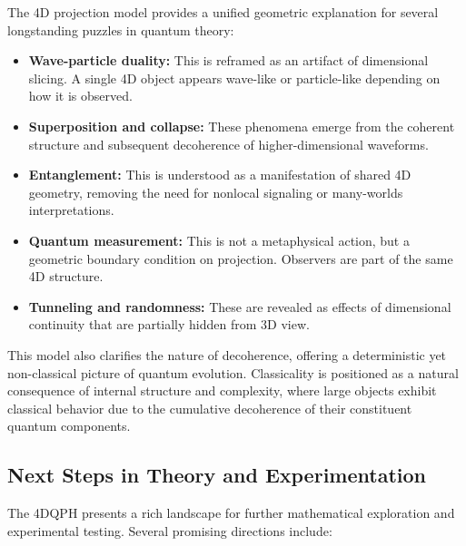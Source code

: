 \documentclass[12pt]{article}
\begin{document}
The 4D projection model provides a unified geometric explanation for several longstanding puzzles in quantum theory:

\begin{itemize}
    \item \textbf{Wave-particle duality:} This is reframed as an artifact of dimensional slicing. A single 4D object appears wave-like or particle-like depending on how it is observed.
    \item \textbf{Superposition and collapse:} These phenomena emerge from the coherent structure and subsequent decoherence of higher-dimensional waveforms.
    \item \textbf{Entanglement:} This is understood as a manifestation of shared 4D geometry, removing the need for nonlocal signaling or many-worlds interpretations.
    \item \textbf{Quantum measurement:} This is not a metaphysical action, but a geometric boundary condition on projection. Observers are part of the same 4D structure.
    \item \textbf{Tunneling and randomness:} These are revealed as effects of dimensional continuity that are partially hidden from 3D view.
\end{itemize}

This model also clarifies the nature of decoherence, offering a deterministic yet non-classical picture of quantum evolution. Classicality is positioned as a natural consequence of internal structure and complexity, where large objects exhibit classical behavior due to the cumulative decoherence of their constituent quantum components.

\subsection*{Next Steps in Theory and Experimentation}

The 4DQPH presents a rich landscape for further mathematical exploration and experimental testing. Several promising directions include:
\end{document}

